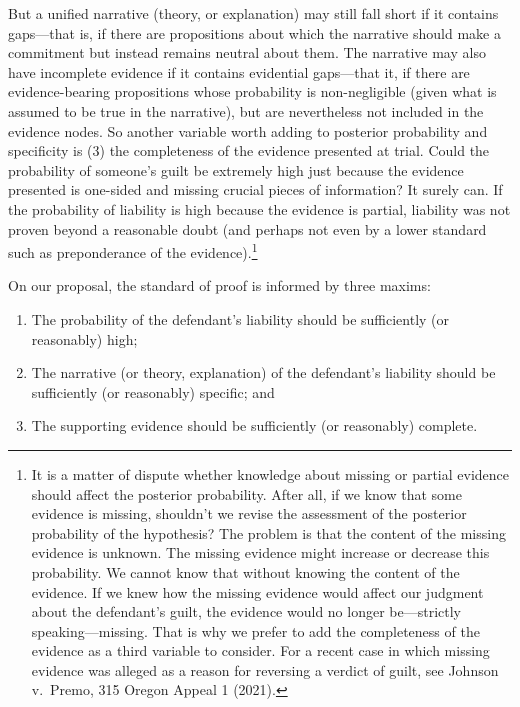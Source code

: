 \documentclass[
  10pt,
  dvipsnames,enabledeprecatedfontcommands]{scrartcl}
\begin{document}
But a unified narrative (theory, or explanation) may still fall short if
it contains gaps---that is, if there are propositions about which the
narrative should make a commitment but instead remains neutral about
them. The narrative may also have incomplete evidence if it contains
evidential gaps---that it, if there are evidence-bearing propositions
whose probability is non-negligible (given what is assumed to be true in
the narrative), but are nevertheless not included in the evidence nodes.
So another variable worth adding to posterior probability and
specificity is (3) the completeness of the evidence presented at trial.
Could the probability of someone's guilt be extremely high just because
the evidence presented is one-sided and missing crucial pieces of
information? It surely can. If the probability of liability is high
because the evidence is partial, liability was not proven beyond a
reasonable doubt (and perhaps not even by a lower standard such as
preponderance of the evidence).\footnote{It is a matter of dispute
  whether knowledge about missing or partial evidence should affect the
  posterior probability. After all, if we know that some evidence is
  missing, shouldn't we revise the assessment of the posterior
  probability of the hypothesis? The problem is that the content of the
  missing evidence is unknown. The missing evidence might increase or
  decrease this probability. We cannot know that without knowing the
  content of the evidence. If we knew how the missing evidence would
  affect our judgment about the defendant's guilt, the evidence would no
  longer be---strictly speaking---missing. That is why we prefer to add
  the completeness of the evidence as a third variable to consider. For
  a recent case in which missing evidence was alleged as a reason for
  reversing a verdict of guilt, see Johnson v.~Premo, 315 Oregon Appeal
  1 (2021).}

On our proposal, the standard of proof is informed by three maxims:

\begin{enumerate}
\def\labelenumi{\arabic{enumi}.}
\item
  The probability of the defendant's liability should be sufficiently
  (or reasonably) high;
\item
  The narrative (or theory, explanation) of the defendant's liability
  should be sufficiently (or reasonably) specific; and
\item
  The supporting evidence should be sufficiently (or reasonably)
  complete.
\end{enumerate}
\end{document}
